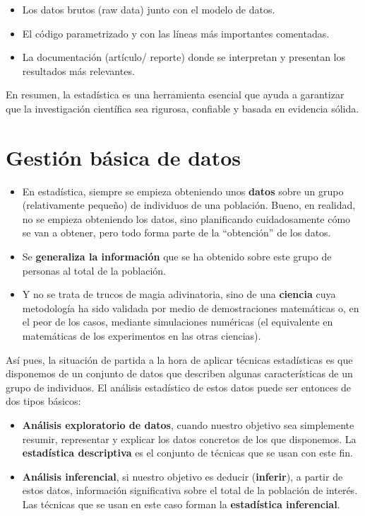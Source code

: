 \documentclass[
  letterpaper,
  DIV=11,
  numbers=noendperiod]{scrreprt}
\begin{document}
\begin{itemize}
  \begin{itemize}
  \item
    Los datos brutos (raw data) junto con el modelo de datos.
  \item
    El código parametrizado y con las líneas más importantes comentadas.
  \item
    La documentación (artículo/ reporte) donde se interpretan y
    presentan los resultados más relevantes.
  \end{itemize}
\end{itemize}

En resumen, la estadística es una herramienta esencial que ayuda a
garantizar que la investigación científica sea rigurosa, confiable y
basada en evidencia sólida.

\section{Gestión básica de datos}\label{gestiuxf3n-buxe1sica-de-datos}

\begin{itemize}
\item
  En estadística, siempre se empieza obteniendo unos \textbf{datos}
  sobre un grupo (relativamente pequeño) de individuos de una población.
  Bueno, en realidad, no se empieza obteniendo los datos, sino
  planificando cuidadosamente cómo se van a obtener, pero todo forma
  parte de la ``obtención'' de los datos.
\item
  Se \textbf{generaliza la información} que se ha obtenido sobre este
  grupo de personas al total de la población.
\item
  Y no se trata de trucos de magia adivinatoria, sino de una
  \textbf{ciencia} cuya metodología ha sido validada por medio de
  demostraciones matemáticas o, en el peor de los casos, mediante
  simulaciones numéricas (el equivalente en matemáticas de los
  experimentos en las otras ciencias).
\end{itemize}

Así pues, la situación de partida a la hora de aplicar técnicas
estadísticas es que disponemos de un conjunto de datos que describen
algunas características de un grupo de individuos. El análisis
estadístico de estos datos puede ser entonces de dos tipos básicos:

\begin{itemize}
\item
  \textbf{Análisis exploratorio de datos}, cuando nuestro objetivo sea
  simplemente resumir, representar y explicar los datos concretos de los
  que disponemos. La \textbf{estadística descriptiva} es el conjunto de
  técnicas que se usan con este fin.
\item
  \textbf{Análisis inferencial}, si nuestro objetivo es deducir
  (\textbf{inferir}), a partir de estos datos, información significativa
  sobre el total de la población de interés. Las técnicas que se usan en
  este caso forman la \textbf{estadística inferencial}.
\end{itemize}
\end{document}
